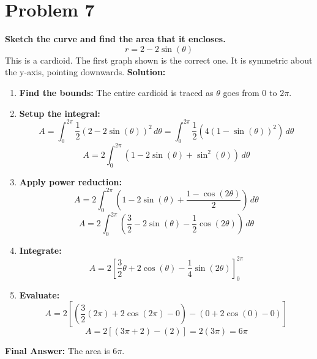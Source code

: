 \documentclass{article}
\begin{document}
\section*{Problem 7}
\textbf{Sketch the curve and find the area that it encloses.}
\[ r = 2 - 2\sin(\theta) \]
This is a cardioid. The first graph shown is the correct one. It is symmetric about the y-axis, pointing downwards.
\textbf{Solution:}
\begin{enumerate}
    \item \textbf{Find the bounds:} The entire cardioid is traced as $\theta$ goes from $0$ to $2\pi$.
    \item \textbf{Setup the integral:}
    \[ A = \int_{0}^{2\pi} \frac{1}{2} (2 - 2\sin(\theta))^2 \,d\theta = \int_{0}^{2\pi} \frac{1}{2} (4(1 - \sin(\theta))^2) \,d\theta \]
    \[ A = 2 \int_{0}^{2\pi} (1 - 2\sin(\theta) + \sin^2(\theta)) \,d\theta \]
    \item \textbf{Apply power reduction:}
    \[ A = 2 \int_{0}^{2\pi} \left(1 - 2\sin(\theta) + \frac{1 - \cos(2\theta)}{2}\right) \,d\theta \]
    \[ A = 2 \int_{0}^{2\pi} \left(\frac{3}{2} - 2\sin(\theta) - \frac{1}{2}\cos(2\theta)\right) \,d\theta \]
    \item \textbf{Integrate:}
    \[ A = 2 \left[ \frac{3}{2}\theta + 2\cos(\theta) - \frac{1}{4}\sin(2\theta) \right]_{0}^{2\pi} \]
    \item \textbf{Evaluate:}
    \[ A = 2 \left[ \left(\frac{3}{2}(2\pi) + 2\cos(2\pi) - 0\right) - \left(0 + 2\cos(0) - 0\right) \right] \]
    \[ A = 2 [ (3\pi + 2) - (2) ] = 2(3\pi) = 6\pi \]
\end{enumerate}
\textbf{Final Answer:} The area is $6\pi$.
\end{document}
